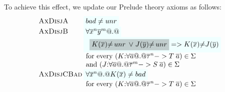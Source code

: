\documentclass[preprint,nocopyrightspace,draft]{sigplanconf}
\begin{document}
To achieve this effect, we update our Prelude theory axioms as follows:
{\small
\[\setlength{\arraycolsep}{1pt}
\begin{array}{c}
\begin{array}{lll} 
 \textsc{AxDisjA} & \formula{\bad \neq \unr}  \\ 
 \textsc{AxDisjB} & \formula{\forall \oln{x}{n}\oln{y}{m} @.@} \\ 
                  & \formula{\;\;\highlight{K(\ol{x}){\neq}\unr\;\lor\;J(\ol{y}){\neq}\unr} =>
                                  K(\ol{x}){\neq}J(\ol{y})} \\
                  & \text{ for every } (K{:}\forall\as @.@ \oln{\tau}{n} -> T\;\as) \in \Sigma \\ 
                  & \text{ and } (J{:}\forall\as @.@ \oln{\tau}{m} -> S\;\as) \in \Sigma \\
 \textsc{AxDisjCBad} & \formula{\forall \oln{x}{n} @.@ K(\ol{x}) \neq \bad} \\ 
                  & \text{ for every } (K{:}\forall\as @.@ \oln{\tau}{n} -> T\;\as) \in \Sigma \\ \\


\end{array}
\end{array}\]}
\end{document}
